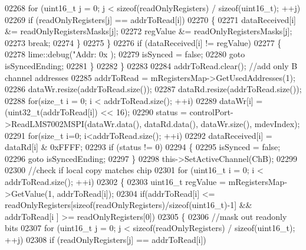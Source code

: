 \begin{DoxyCode}
{{{{{{{{{{{{{{{{{{{{{{{{{{{{{{{{{{{{{{{{{{{{{{{{{{{{{{{{{{{{{{02268             \textcolor{keywordflow}{for} (uint16\_t j = 0; j < \textcolor{keyword}{sizeof}(readOnlyRegisters) / \textcolor{keyword}{sizeof}(uint16\_t); ++j)
02269                 \textcolor{keywordflow}{if} (readOnlyRegisters[j] == addrToRead[i])
02270                 \{
02271                     dataReceived[i] &= readOnlyRegistersMasks[j];
02272                     regValue &= readOnlyRegistersMasks[j];
02273                     \textcolor{keywordflow}{break};
02274                 \}
02275         \}
02276         \textcolor{keywordflow}{if} (dataReceived[i] != regValue)
02277         \{
02278             lime::debug(\textcolor{stringliteral}{"Addr: 0x%
      );
02279             isSynced = \textcolor{keyword}{false};
02280             \textcolor{keywordflow}{goto} isSyncedEnding;
02281         \}
02282     \}
02283 
02284     addrToRead.clear(); \textcolor{comment}{//add only B channel addresses}
02285     addrToRead = mRegistersMap->GetUsedAddresses(1);
02286     dataWr.resize(addrToRead.size());
02287     dataRd.resize(addrToRead.size());
02288     \textcolor{keywordflow}{for}(\textcolor{keywordtype}{size\_t} i = 0; i < addrToRead.size(); ++i)
02289         dataWr[i] = (uint32\_t(addrToRead[i]) << 16);
02290     status = controlPort->ReadLMS7002MSPI(dataWr.data(),  dataRd.data(), dataWr.size(),
      mdevIndex);
02291     \textcolor{keywordflow}{for}(\textcolor{keywordtype}{size\_t} i=0; i<addrToRead.size(); ++i)
02292         dataReceived[i] = dataRd[i] & 0xFFFF;
02293     \textcolor{keywordflow}{if} (status != 0)
02294     \{
02295         isSynced = \textcolor{keyword}{false};
02296         \textcolor{keywordflow}{goto} isSyncedEnding;
02297     \}
02298     this->SetActiveChannel(ChB);
02299 
02300     \textcolor{comment}{//check if local copy matches chip}
02301     \textcolor{keywordflow}{for} (uint16\_t i = 0; i < addrToRead.size(); ++i)
02302     \{
02303         uint16\_t regValue = mRegistersMap->GetValue(1, addrToRead[i]);
02304         \textcolor{keywordflow}{if}(addrToRead[i] <= readOnlyRegisters[\textcolor{keyword}{sizeof}(readOnlyRegisters)/\textcolor{keyword}{sizeof}(uint16\_t)-1] && addrToRead[i
      ] >= readOnlyRegisters[0])
02305         \{
02306             \textcolor{comment}{//mask out readonly bits}
02307             \textcolor{keywordflow}{for} (uint16\_t j = 0; j < \textcolor{keyword}{sizeof}(readOnlyRegisters) / \textcolor{keyword}{sizeof}(uint16\_t); ++j)
02308                 \textcolor{keywordflow}{if} (readOnlyRegisters[j] == addrToRead[i])
}}}}}}}}}}}}}}}}}}}}}}}}}}}}}}}}}}}}}}}}}}}}}}}}}}}}}}}}}}}}}}}
\end{DoxyCode}
